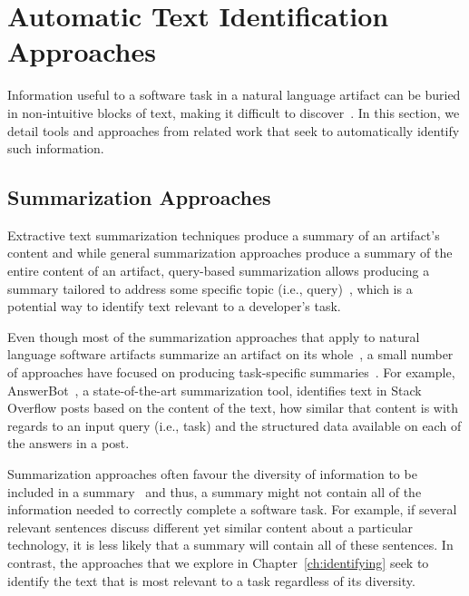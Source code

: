 \section{Automatic Text Identification Approaches}
\label{cp2:automatic-approaches}



Information useful to a software task in a natural language artifact can be buried in  
non-intuitive blocks of text, making it difficult to discover~\cite{Robillard2015}.
In this section, we detail tools and approaches from related work
that seek to automatically identify such information.








\subsection{Summarization Approaches}
\label{cp2:summarization}



Extractive text summarization techniques 
produce a summary of an artifact's content
and while general summarization approaches produce a summary of the entire content of an artifact, 
query-based summarization allows 
producing a summary tailored to address some specific topic (i.e., query)~\cite{Goldsteinet1999}, which is a potential way to identify 
text relevant to a developer's task. 


Even though most of the summarization approaches that apply to natural language software artifacts 
summarize an artifact on its whole~\cite{Rastkar2010, Murray2008, Lotufo2012, Ponzanelli2015},
a small number of approaches have focused on
producing task-specific summaries~\cite{Xu2017, silva2019}.
For example, 
 AnswerBot~\cite{Xu2017},
 a state-of-the-art summarization tool, 
identifies text
in Stack Overflow posts 
based on 
the content of the text, how similar that content is with regards to an input query (i.e., task)
and the structured data available on each of the answers in a post.



Summarization approaches often favour the diversity of information to be included in a summary~\cite{Carbonell1998,li2018deep}
and thus, a summary might not contain all of the information needed 
to correctly complete a software task.
For example, if several relevant sentences discuss different yet similar content about 
a particular technology, it is less likely that a summary will contain all of these sentences. 
In contrast, the approaches that we explore in Chapter~\ref{ch:identifying}
seek to identify the text that is most relevant to a task regardless 
of its diversity.




